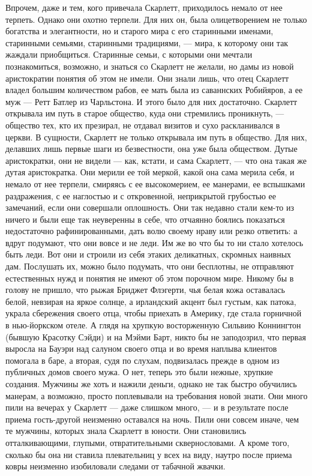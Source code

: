 Впрочем, даже и тем, кого привечала Скарлетт, приходилось немало от нее терпеть. Однако они охотно терпели. Для них он, была олицетворением не только богатства и элегантности, но и старого мира с его старинными именами, старинными семьями, старинными традициями, — мира, к которому они так жаждали приобщиться. Старинные семьи, с которыми они мечтали познакомиться, возможно, и знаться со Скарлетт не желали, но дамы из новой аристократии понятия об этом не имели. Они знали лишь, что отец Скарлетт владел большим количеством рабов, ее мать была из саваннских Робийяров, а ее муж — Ретт Батлер из Чарльстона. И этого было для них достаточно. Скарлетт открывала им путь в старое общество, куда они стремились проникнуть, — общество тех, кто их презирал, не отдавал визитов и сухо раскланивался в церкви. В сущности, Скарлетт не только открывала им путь в общество. Для них, делавших лишь первые шаги из безвестности, она уже была обществом. Дутые аристократки, они не видели — как, кстати, и сама Скарлетт, — что она такая же дутая аристократка. Они мерили ее той меркой, какой она сама мерила себя, и немало от нее терпели, смиряясь с ее высокомерием, ее манерами, ее вспышками раздражения, с ее наглостью и с откровенной, неприкрытой грубостью ее замечаний, если они совершали оплошность.
Они так недавно стали кем-то из ничего и были еще так неуверенны в себе, что отчаянно боялись показаться недостаточно рафинированными, дать волю своему нраву или резко ответить: а вдруг подумают, что они вовсе и не леди. Им же во что бы то ни стало хотелось быть леди. Вот они и строили из себя этаких деликатных, скромных наивных дам. Послушать их, можно было подумать, что они бесплотны, не отправляют естественных нужд и понятия не имеют об этом порочном мире. Никому бы в голову не пришло, что рыжая Бриджет Флэгерти, чья белая кожа оставалась белой, невзирая на яркое солнце, а ирландский акцент был густым, как патока, украла сбережения своего отца, чтобы приехать в Америку, где стала горничной в нью-йоркском отеле. А глядя на хрупкую восторженную Сильвию Коннингтон (бывшую Красотку Сэйди) и на Мэйми Барт, никто бы не заподозрил, что первая выросла на Бауэри над салуном своего отца и во время наплыва клиентов помогала в баре, а вторая, судя по слухам, подвизалась прежде в одном из публичных домов своего мужа. О нет, теперь это были нежные, хрупкие создания.
Мужчины же хоть и нажили деньги, однако не так быстро обучились манерам, а возможно, просто поплевывали на требования новой знати. Они много пили на вечерах у Скарлетт — даже слишком много, — и в результате после приема гость-другой неизменно оставался на ночь. Пили они совсем иначе, чем те мужчины, которых знала Скарлетт в юности. Они становились отталкивающими, глупыми, отвратительными сквернословами. А кроме того, сколько бы она ни ставила плевательниц у всех на виду, наутро после приема ковры неизменно изобиловали следами от табачной жвачки.
